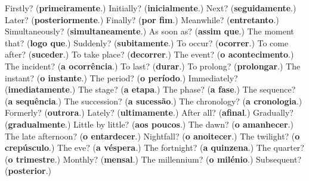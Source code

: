 \begin{tcolorbox}[breakable,colback=teal!4,colframe=teal!35!black,title={Before you move on}]
Firstly? (\textbf{primeiramente}.) Initially? (\textbf{inicialmente}.) Next? (\textbf{seguidamente}.) Later? (\textbf{posteriormente}.) Finally? (\textbf{por fim}.) Meanwhile? (\textbf{entretanto}.) Simultaneously? (\textbf{simultaneamente}.) As soon as? (\textbf{assim que}.) The moment that? (\textbf{logo que}.) Suddenly? (\textbf{subitamente}.) To occur? (\textbf{ocorrer}.) To come after? (\textbf{suceder}.) To take place? (\textbf{decorrer}.) The event? (\textbf{o acontecimento}.) The incident? (\textbf{a ocorrência}.) To last? (\textbf{durar}.) To prolong? (\textbf{prolongar}.) The instant? (\textbf{o instante}.) The period? (\textbf{o período}.) Immediately? (\textbf{imediatamente}.) The stage? (\textbf{a etapa}.) The phase? (\textbf{a fase}.) The sequence? (\textbf{a sequência}.) The succession? (\textbf{a sucessão}.) The chronology? (\textbf{a cronologia}.) Formerly? (\textbf{outrora}.) Lately? (\textbf{ultimamente}.) After all? (\textbf{afinal}.) Gradually? (\textbf{gradualmente}.) Little by little? (\textbf{aos poucos}.) The dawn? (\textbf{o amanhecer}.) The late afternoon? (\textbf{o entardecer}.) Nightfall? (\textbf{o anoitecer}.) The twilight? (\textbf{o crepúsculo}.) The eve? (\textbf{a véspera}.) The fortnight? (\textbf{a quinzena}.) The quarter? (\textbf{o trimestre}.) Monthly? (\textbf{mensal}.) The millennium? (\textbf{o milénio}.) Subsequent? (\textbf{posterior}.)
\end{tcolorbox}
